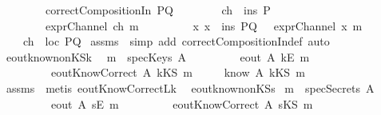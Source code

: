 \begin{isabellebody}
\ \ \ \ \ \ \ \ {\isachardoublequoteopen}correctCompositionIn\ PQ{\isachardoublequoteclose}\isanewline
\ \ \ \ \ \ \ \ {\isachardoublequoteopen}ch\ {\isacharcolon}\ ins\ P{\isachardoublequoteclose}\isanewline
\ \ \ \ \ \ \ \ {\isachardoublequoteopen}exprChannel\ ch\ m{\isachardoublequoteclose}\isanewline
\ \ \ \ \ \ \ \ {\isachardoublequoteopen}{\isasymforall}\ x{\isachardot}\ x\ {\isasymin}\ ins\ PQ\ {\isasymlongrightarrow}\ {\isasymnot}\ exprChannel\ x\ m{\isachardoublequoteclose}\isanewline
{}\ \ \ \ {\isachardoublequoteopen}ch\ {\isacharcolon}\ loc\ PQ{\isachardoublequoteclose}\isanewline
\isadelimproof
\endisadelimproof
\isatagproof
{}\isamarkupfalse \ assms\ \isamarkupfalse \ {\isacharparenleft}simp\ add{\isacharcolon}\ correctCompositionIn{\isacharunderscore}def{\isacharcomma}\ auto{\isacharparenright}\endisatagproof
{\isafoldproof}\isadelimproof
\isanewline
\endisadelimproof
\isanewline
{}\isamarkupfalse \ eout{\isacharunderscore}know{\isacharunderscore}nonKS{\isacharunderscore}k{\isacharcolon}\ \isanewline
{}\ {\isachardoublequoteopen}m\ {\isasymnotin}\ specKeys\ A{\isachardoublequoteclose}\isanewline
\ \ \ \ \ \ \ \ \ {\isachardoublequoteopen}eout\ A\ {\isacharparenleft}kE\ m{\isacharparenright}{\isachardoublequoteclose}\isanewline
\ \ \ \ \ \ \ \ \ {\isachardoublequoteopen}eoutKnowCorrect\ A\ {\isacharparenleft}kKS\ m{\isacharparenright}{\isachardoublequoteclose}\isanewline
{}\ \ \ \ \ {\isachardoublequoteopen}know\ A\ {\isacharparenleft}kKS\ m{\isacharparenright}{\isachardoublequoteclose}\isanewline
\isadelimproof
\endisadelimproof
\isatagproof
{}\isamarkupfalse \ assms\ \isamarkupfalse \ {\isacharparenleft}metis\ eoutKnowCorrect{\isacharunderscore}L{}k{\isacharparenright}\endisatagproof
{\isafoldproof}\isadelimproof
\isanewline
\endisadelimproof
\isanewline
{}\isamarkupfalse \ \ eout{\isacharunderscore}know{\isacharunderscore}nonKS{\isacharunderscore}s{\isacharcolon}\isanewline
{}\ {\isachardoublequoteopen}m\ {\isasymnotin}\ specSecrets\ A{\isachardoublequoteclose}\isanewline
\ \ \ \ \ \ \ \ \ {\isachardoublequoteopen}eout\ A\ {\isacharparenleft}sE\ m{\isacharparenright}{\isachardoublequoteclose}\isanewline
\ \ \ \ \ \ \ \ \ {\isachardoublequoteopen}eoutKnowCorrect\ A\ {\isacharparenleft}sKS\ m{\isacharparenright}{\isachardoublequoteclose}\isanewline

\end{isabellebody}
